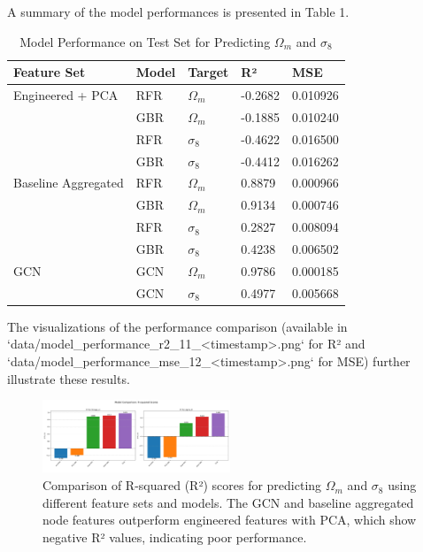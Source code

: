 \documentclass[twocolumn]{aastex631}
\begin{document}
A summary of the model performances is presented in Table 1.

\begin{table}[h!]
\centering
\caption{Model Performance on Test Set for Predicting $\Omega_m$ and $\sigma_8$}
\begin{tabular}{|l|l|l|l|l|}
\hline
Feature Set             & Model & Target    & R²      & MSE        \\ \hline
Engineered + PCA    & RFR   & $\Omega_m$  & -0.2682 & 0.010926   \\ \hline
                        & GBR   & $\Omega_m$  & -0.1885 & 0.010240   \\ \hline
                        & RFR   & $\sigma_8$  & -0.4622 & 0.016500   \\ \hline
                        & GBR   & $\sigma_8$  & -0.4412 & 0.016262   \\ \hline
Baseline Aggregated & RFR   & $\Omega_m$  & 0.8879  & 0.000966   \\ \hline
                        & GBR   & $\Omega_m$  & 0.9134  & 0.000746   \\ \hline
                        & RFR   & $\sigma_8$  & 0.2827  & 0.008094   \\ \hline
                        & GBR   & $\sigma_8$  & 0.4238  & 0.006502   \\ \hline
GCN                     & GCN   & $\Omega_m$  & 0.9786  & 0.000185   \\ \hline
                        & GCN   & $\sigma_8$  & 0.4977  & 0.005668   \\ \hline
\end{tabular}
\label{tab:model_performance}
\end{table}

The visualizations of the performance comparison (available in `data/model_performance_r2_11_<timestamp>.png` for R² and `data/model_performance_mse_12_<timestamp>.png` for MSE) further illustrate these results.

\begin{figure}[h!]
    \centering
    \includegraphics[width=0.5\textwidth]{../input_files/plots/model_performance_r2_11_20250527-135752.png}
    \caption{Comparison of R-squared (R²) scores for predicting $\Omega_m$ and $\sigma_8$ using different feature sets and models. The GCN and baseline aggregated node features outperform engineered features with PCA, which show negative R² values, indicating poor performance.}
    \label{fig:model_performance_r2}
\end{figure}
\end{document}
